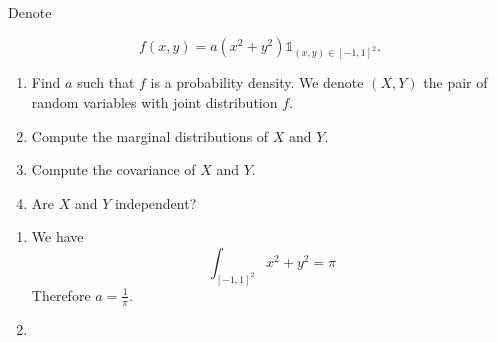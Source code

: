 \begin{Exercise}
  Denote

  \[
    f(x, y)=a\left(x^{2}+y^{2}\right) \mathbb{1}_{(x, y) \in {[-1,1]}^{2}} .
  \]

  \begin{enumerate}
    \item Find $a$ such that $f$ is a probability density. We denote $(X, Y)$ the pair of
          random variables with joint distribution $f$.

    \item Compute the marginal distributions of $X$ and $Y$.

    \item Compute the covariance of $X$ and $Y$.

    \item Are $X$ and $Y$ independent?

  \end{enumerate}
\end{Exercise}


\begin{solution}
  \begin{enumerate}
    \item   We have
          \[
            \int_{{[-1, 1]}^2} x^2 + y^2 = \pi
          \]
          Therefore $a = \frac{1}{\pi}$.
    \item
  \end{enumerate}
\end{solution}


